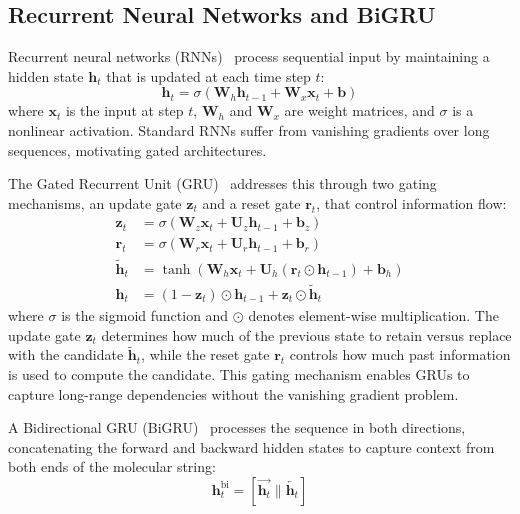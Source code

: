 \documentclass[journal=jcisd8,manuscript=article]{achemso}
\newcommand{\vect}[1]{\mathbf{#1}}
\newcommand{\matr}[1]{\mathbf{#1}}
\newcommand{\removed}[1]{{\color{removedred}#1}}
\begin{document}
\subsection{Recurrent Neural Networks and BiGRU}
\label{sec:bigru}

\removed{Recurrent neural networks (RNNs)~\cite{elman1990finding} process sequential input by maintaining a hidden state $\vect{h}_t$ that is updated at each time step $t$:
\begin{equation}
 \vect{h}_t = \sigma(\matr{W}_h \vect{h}_{t-1} + \matr{W}_x \vect{x}_t + \vect{b})
\end{equation}
where $\vect{x}_t$ is the input at step $t$, $\matr{W}_h$ and $\matr{W}_x$ are weight matrices, and $\sigma$ is a nonlinear activation.
Standard RNNs suffer from vanishing gradients over long sequences, motivating gated architectures.

The Gated Recurrent Unit (GRU)~\cite{cho2014learning} addresses this through two gating mechanisms, an update gate $\vect{z}_t$ and a reset gate $\vect{r}_t$, that control information flow:
\begin{align}
 \vect{z}_t &= \sigma(\matr{W}_z \vect{x}_t + \matr{U}_z \vect{h}_{t-1} + \vect{b}_z) \label{eq:gru_update} \\
 \vect{r}_t &= \sigma(\matr{W}_r \vect{x}_t + \matr{U}_r \vect{h}_{t-1} + \vect{b}_r) \label{eq:gru_reset} \\
 \tilde{\vect{h}}_t &= \tanh(\matr{W}_h \vect{x}_t + \matr{U}_h (\vect{r}_t \odot \vect{h}_{t-1}) + \vect{b}_h) \label{eq:gru_candidate} \\
 \vect{h}_t &= (1 - \vect{z}_t) \odot \vect{h}_{t-1} + \vect{z}_t \odot \tilde{\vect{h}}_t \label{eq:gru_output}
\end{align}
where $\sigma$ is the sigmoid function and $\odot$ denotes element-wise multiplication.
The update gate $\vect{z}_t$ determines how much of the previous state to retain versus replace with the candidate $\tilde{\vect{h}}_t$, while the reset gate $\vect{r}_t$ controls how much past information is used to compute the candidate.
This gating mechanism enables GRUs to capture long-range dependencies without the vanishing gradient problem.

A Bidirectional GRU (BiGRU)~\cite{schuster1997bidirectional} processes the sequence in both directions, concatenating the forward and backward hidden states to capture context from both ends of the molecular string:
\begin{equation}
 \vect{h}_t^{\text{bi}} = [\overrightarrow{\vect{h}_t} \| \overleftarrow{\vect{h}_t}]
\end{equation}

}
\end{document}
